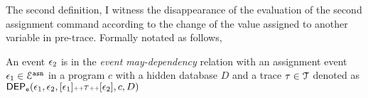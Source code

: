  The second definition, I witness the disappearance of the evaluation of the second assignment command  according to the change of the value assigned to another variable in pre-trace.
%
Formally notated as follows,
\begin{defn}
\label{def:event_dep}
  An event $\mathtt{\epsilon}_2$ is in the \emph{event may-dependency} relation with an assignment
  event $\mathtt{\epsilon}_1 \in \mathcal{E}^{\mathtt{{asn}}}$ in a program ${c}$
  with a hidden database $D$ and a trace $\mathtt{\tau} \in \mathcal{T}$ denoted as 
  $\mathsf{DEP_{\mathtt{e}}}(\mathtt{\epsilon}_1, \mathtt{\epsilon}_2, [\mathtt{\epsilon}_1 ] {\scriptscriptstyle ++} \mathtt{\tau} {\scriptscriptstyle ++} [\mathtt{\epsilon}_2], c, D)$
%
\end{defn}
